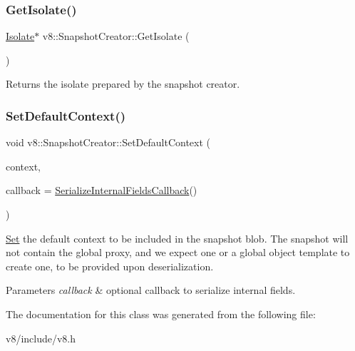 \subsubsection{\texorpdfstring{Get\+Isolate()}{GetIsolate()}}
{\footnotesize\ttfamily \mbox{\hyperlink{classv8_1_1Isolate}{Isolate}}$\ast$ v8\+::\+Snapshot\+Creator\+::\+Get\+Isolate (\begin{DoxyParamCaption}{ }\end{DoxyParamCaption})}

\begin{DoxyReturn}{Returns}
the isolate prepared by the snapshot creator. 
\end{DoxyReturn}
\mbox{\label{classv8_1_1SnapshotCreator_aaeed7b1a205009c62d7e60deefe6e805}} 
\subsubsection{\texorpdfstring{Set\+Default\+Context()}{SetDefaultContext()}}
{\footnotesize\ttfamily void v8\+::\+Snapshot\+Creator\+::\+Set\+Default\+Context (\begin{DoxyParamCaption}\item[{\mbox{\hyperlink{classv8_1_1Local}{Local}}$<$ \mbox{\hyperlink{classv8_1_1Context}{Context}} $>$}]{context,  }\item[{\mbox{\hyperlink{structv8_1_1SerializeInternalFieldsCallback}{Serialize\+Internal\+Fields\+Callback}}}]{callback = {\ttfamily \mbox{\hyperlink{structv8_1_1SerializeInternalFieldsCallback}{Serialize\+Internal\+Fields\+Callback}}()} }\end{DoxyParamCaption})}

\mbox{\hyperlink{classv8_1_1Set}{Set}} the default context to be included in the snapshot blob. The snapshot will not contain the global proxy, and we expect one or a global object template to create one, to be provided upon deserialization.


\begin{DoxyParams}{Parameters}
{\em callback} & optional callback to serialize internal fields. \\
\hline
\end{DoxyParams}


The documentation for this class was generated from the following file\+:\begin{DoxyCompactItemize}
\item 
v8/include/v8.\+h\end{DoxyCompactItemize}
